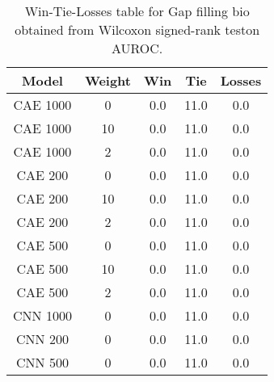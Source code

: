 \begin{table}[H]
\centering
\begin{tabular}{|c|c|c|c|c|}

\textbf{Model} & \textbf{Weight} &  \textbf{Win} &  \textbf{Tie} &  \textbf{Losses} \\
\hline

      CAE 1000 &               0 &           0.0 &          11.0 &              0.0 \\
\hline
      CAE 1000 &              10 &           0.0 &          11.0 &              0.0 \\
\hline
      CAE 1000 &               2 &           0.0 &          11.0 &              0.0 \\
\hline
       CAE 200 &               0 &           0.0 &          11.0 &              0.0 \\
\hline
       CAE 200 &              10 &           0.0 &          11.0 &              0.0 \\
\hline
       CAE 200 &               2 &           0.0 &          11.0 &              0.0 \\
\hline
       CAE 500 &               0 &           0.0 &          11.0 &              0.0 \\
\hline
       CAE 500 &              10 &           0.0 &          11.0 &              0.0 \\
\hline
       CAE 500 &               2 &           0.0 &          11.0 &              0.0 \\
\hline
      CNN 1000 &               0 &           0.0 &          11.0 &              0.0 \\
\hline
       CNN 200 &               0 &           0.0 &          11.0 &              0.0 \\
\hline
       CNN 500 &               0 &           0.0 &          11.0 &              0.0 \\
\hline

\end{tabular}
\caption{Win-Tie-Losses table for Gap filling bio obtained from Wilcoxon signed-rank teston AUROC.}
\label{tab:gap_filling_bio_weighted_comparison_all}
\end{table}
